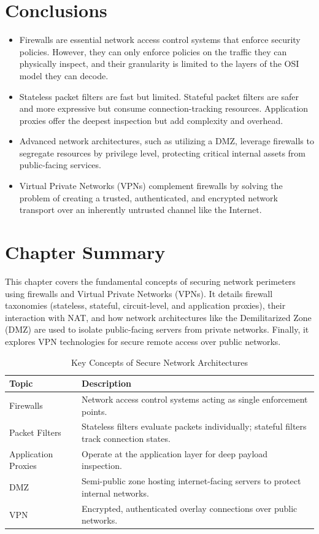 \section{Conclusions}

\begin{itemize}
    \item Firewalls are essential network access control systems that enforce security policies. However, they can only enforce policies on the traffic they can physically inspect, and their granularity is limited to the layers of the OSI model they can decode.
    \item Stateless packet filters are fast but limited. Stateful packet filters are safer and more expressive but consume connection-tracking resources. Application proxies offer the deepest inspection but add complexity and overhead.
    \item Advanced network architectures, such as utilizing a DMZ, leverage firewalls to segregate resources by privilege level, protecting critical internal assets from public-facing services.
    \item Virtual Private Networks (VPNs) complement firewalls by solving the problem of creating a trusted, authenticated, and encrypted network transport over an inherently untrusted channel like the Internet.
\end{itemize}

\section*{Chapter Summary}
This chapter covers the fundamental concepts of securing network perimeters using firewalls and Virtual Private Networks (VPNs). It details firewall taxonomies (stateless, stateful, circuit-level, and application proxies), their interaction with NAT, and how network architectures like the Demilitarized Zone (DMZ) are used to isolate public-facing servers from private networks. Finally, it explores VPN technologies for secure remote access over public networks.

\begin{table}[h]
\centering
\begin{tabular}{|l|p{10cm}|}
\hline
\textbf{Topic} & \textbf{Description} \\
\hline
Firewalls & Network access control systems acting as single enforcement points. \\
\hline
Packet Filters & Stateless filters evaluate packets individually; stateful filters track connection states. \\
\hline
Application Proxies & Operate at the application layer for deep payload inspection. \\
\hline
DMZ & Semi-public zone hosting internet-facing servers to protect internal networks. \\
\hline
VPN & Encrypted, authenticated overlay connections over public networks. \\
\hline
\end{tabular}
\caption{Key Concepts of Secure Network Architectures}
\label{tab:secure_networks_summary}
\end{table}
